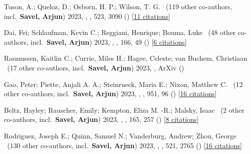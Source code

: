 \item[{\color{numcolor}\scriptsize39}] Tuson, A.; Queloz, D.; Osborn, H. P.; Wilson, T. G. \etal\ ({119} other co-authors, incl.\ \textbf{Savel, Arjun}) 2023, , \mnras, {523}, 3090 () [\href{https://ui.adsabs.harvard.edu/abs/2023MNRAS.523.3090T}{11 citations}]

\item[{\color{numcolor}\scriptsize38}] Dai, Fei; Schlaufman, Kevin C.; Reggiani, Henrique; Bouma, Luke \etal\ ({48} other co-authors, incl.\ \textbf{Savel, Arjun}) 2023, , \aj, {166}, 49 () [\href{https://ui.adsabs.harvard.edu/abs/2023AJ....166...49D}{6 citations}]

\item[{\color{numcolor}\scriptsize37}] Rasmussen, Kaitlin C.; Currie, Miles H.; Hagee, Celeste; van Buchem, Christiaan \etal\ ({17} other co-authors, incl.\ \textbf{Savel, Arjun}) 2023, , ArXiv ()

\item[{\color{numcolor}\scriptsize36}] Gao, Peter; Piette, Anjali A. A.; Steinrueck, Maria E.; Nixon, Matthew C. \etal\ ({12} other co-authors, incl.\ \textbf{Savel, Arjun}) 2023, , \apj, {951}, 96 () [\href{https://ui.adsabs.harvard.edu/abs/2023ApJ...951...96G}{16 citations}]

\item[{\color{numcolor}\scriptsize35}] Beltz, Hayley; Rauscher, Emily; Kempton, Eliza M. -R.; Malsky, Isaac \etal\ ({2} other co-authors, incl.\ \textbf{Savel, Arjun}) 2023, , \aj, {165}, 257 () [\href{https://ui.adsabs.harvard.edu/abs/2023AJ....165..257B}{8 citations}]

\item[{\color{numcolor}\scriptsize34}] Rodriguez, Joseph E.; Quinn, Samuel N.; Vanderburg, Andrew; Zhou, George \etal\ ({130} other co-authors, incl.\ \textbf{Savel, Arjun}) 2023, , \mnras, {521}, 2765 () [\href{https://ui.adsabs.harvard.edu/abs/2023MNRAS.521.2765R}{16 citations}]

